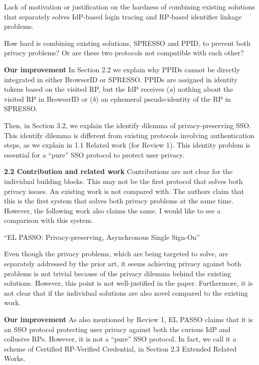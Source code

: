 \documentclass[letterpaper,onecolumn,10pt]{article}
\begin{document}
Lack of motivation or justification on the hardness of combining existing solutions that separately solves IdP-based login tracing and RP-based identifier linkage problems.

How hard is combining existing solutions, SPRESSO and PPID, to prevent both privacy problems? Or are these two protocols not compatible with each other?

\vspace{1mm}\noindent\textbf{Our improvement}
In Section 2.2 we explain why PPIDs cannot be directly integrated in either BrowserID or SPRESSO.
PPIDs are assigned in identity tokens based on the visited RP, but the IdP receives (\emph{a}) nothing about the
visited RP in BrowserID or (\emph{b}) an ephemeral pseudo-identity of the RP in SPRESSO.

Then, in Section 3.2, we explain the identify dilemma of privacy-preserving SSO.
This identify dilemma is different from existing protocols involving authentication steps,
    as we explain in 1.1 Related work (for Review 1).
This identity problem is essential for a ``pure'' SSO protocol to protect user privacy.

\vspace{1mm}\noindent\textbf{2.2 Contribution and related work}
Contributions are not clear for the individual building blocks.
This may not be the first protocol that solves both privacy issues. An existing work is not compared with.
The authors claim that this is the first system that solves both privacy problems at the same time. However, the following work also claims the same. I would like to see a comparison with this system.

\noindent``EL PASSO: Privacy-preserving, Asynchronous Single Sign-On''

Even though the privacy problems, which are being targeted to solve, are separately addressed by the prior art,
 it seems achieving privacy against both problems is not trivial because of the privacy dilemma behind the existing solutions.
However, this point is not well-justified in the paper.
Furthermore, it is not clear that if the individual solutions are also novel compared to the existing work.

\vspace{1mm}\noindent\textbf{Our improvement}
As also mentioned by Review 1, EL PASSO claims that it is an SSO protocol protecting user privacy against both the curious IdP and collusive RPs.
However, it is not a ``pure'' SSO protocol. In fact, we call it a scheme of Certified RP-Verified Credential, in Section 2.3 Extended Related Works.
\end{document}
